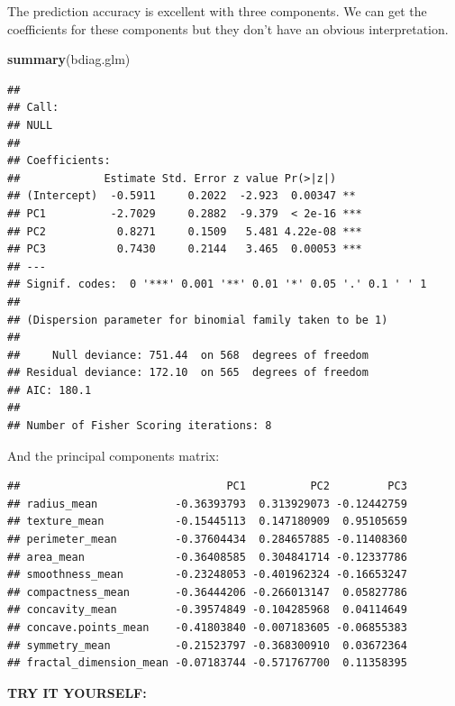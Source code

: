 \documentclass[
]{book}
\newenvironment{Shaded}{\begin{snugshade}}{\end{snugshade}}
\newcommand{\FunctionTok}[1]{\textcolor[rgb]{0.13,0.29,0.53}{\textbf{#1}}}
\newcommand{\NormalTok}[1]{#1}
\newcommand{\SpecialCharTok}[1]{\textcolor[rgb]{0.81,0.36,0.00}{\textbf{#1}}}
\begin{document}
The prediction accuracy is excellent with three components. We can get the
coefficients for these components but they don't have an obvious interpretation.

\begin{Shaded}
\begin{Highlighting}[]
\FunctionTok{summary}\NormalTok{(bdiag.glm)}
\end{Highlighting}
\end{Shaded}

\begin{verbatim}
## 
## Call:
## NULL
## 
## Coefficients:
##             Estimate Std. Error z value Pr(>|z|)    
## (Intercept)  -0.5911     0.2022  -2.923  0.00347 ** 
## PC1          -2.7029     0.2882  -9.379  < 2e-16 ***
## PC2           0.8271     0.1509   5.481 4.22e-08 ***
## PC3           0.7430     0.2144   3.465  0.00053 ***
## ---
## Signif. codes:  0 '***' 0.001 '**' 0.01 '*' 0.05 '.' 0.1 ' ' 1
## 
## (Dispersion parameter for binomial family taken to be 1)
## 
##     Null deviance: 751.44  on 568  degrees of freedom
## Residual deviance: 172.10  on 565  degrees of freedom
## AIC: 180.1
## 
## Number of Fisher Scoring iterations: 8
\end{verbatim}

And the principal components matrix:

\begin{Shaded}
\end{Shaded}

\begin{verbatim}
##                                PC1          PC2         PC3
## radius_mean            -0.36393793  0.313929073 -0.12442759
## texture_mean           -0.15445113  0.147180909  0.95105659
## perimeter_mean         -0.37604434  0.284657885 -0.11408360
## area_mean              -0.36408585  0.304841714 -0.12337786
## smoothness_mean        -0.23248053 -0.401962324 -0.16653247
## compactness_mean       -0.36444206 -0.266013147  0.05827786
## concavity_mean         -0.39574849 -0.104285968  0.04114649
## concave.points_mean    -0.41803840 -0.007183605 -0.06855383
## symmetry_mean          -0.21523797 -0.368300910  0.03672364
## fractal_dimension_mean -0.07183744 -0.571767700  0.11358395
\end{verbatim}

\textbf{TRY IT YOURSELF:}
\end{document}
